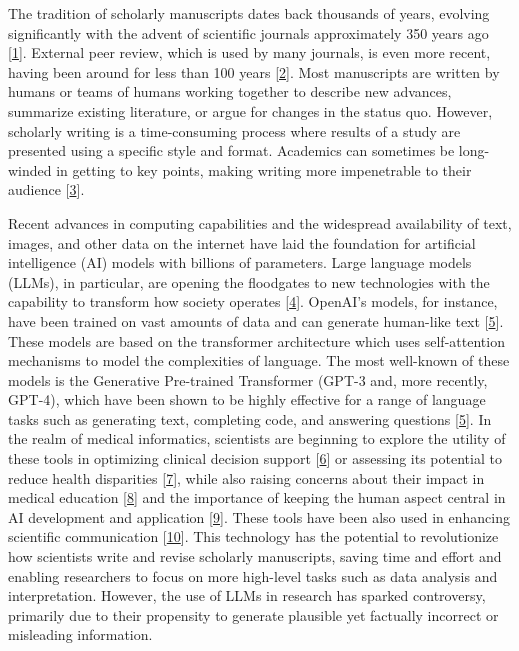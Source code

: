 \documentclass[
]{article}
\begin{document}
The tradition of scholarly manuscripts dates back thousands of years, evolving significantly with the advent of scientific journals approximately 350 years ago {[}\protect\hyperlink{ref-F3iZfGUC}{1}{]}.
External peer review, which is used by many journals, is even more recent, having been around for less than 100 years {[}\protect\hyperlink{ref-1HMhNrQq1}{2}{]}.
Most manuscripts are written by humans or teams of humans working together to describe new advances, summarize existing literature, or argue for changes in the status quo.
However, scholarly writing is a time-consuming process where results of a study are presented using a specific style and format.
Academics can sometimes be long-winded in getting to key points, making writing more impenetrable to their audience {[}\protect\hyperlink{ref-19YWsShi0}{3}{]}.

Recent advances in computing capabilities and the widespread availability of text, images, and other data on the internet have laid the foundation for artificial intelligence (AI) models with billions of parameters.
Large language models (LLMs), in particular, are opening the floodgates to new technologies with the capability to transform how society operates {[}\protect\hyperlink{ref-xq1uEbPa}{4}{]}.
OpenAI's models, for instance, have been trained on vast amounts of data and can generate human-like text {[}\protect\hyperlink{ref-bYOaJHMe}{5}{]}.
These models are based on the transformer architecture which uses self-attention mechanisms to model the complexities of language.
The most well-known of these models is the Generative Pre-trained Transformer (GPT-3 and, more recently, GPT-4), which have been shown to be highly effective for a range of language tasks such as generating text, completing code, and answering questions {[}\protect\hyperlink{ref-bYOaJHMe}{5}{]}.
In the realm of medical informatics, scientists are beginning to explore the utility of these tools in optimizing clinical decision support {[}\protect\hyperlink{ref-gRhoGuC4}{6}{]} or assessing its potential to reduce health disparities {[}\protect\hyperlink{ref-CYB5vhZp}{7}{]}, while also raising concerns about their impact in medical education {[}\protect\hyperlink{ref-h8wInPLE}{8}{]} and the importance of keeping the human aspect central in AI development and application {[}\protect\hyperlink{ref-Z2ek25Ak}{9}{]}.
These tools have been also used in enhancing scientific communication {[}\protect\hyperlink{ref-Svww2RUh}{10}{]}.
This technology has the potential to revolutionize how scientists write and revise scholarly manuscripts, saving time and effort and enabling researchers to focus on more high-level tasks such as data analysis and interpretation.
However, the use of LLMs in research has sparked controversy, primarily due to their propensity to generate plausible yet factually incorrect or misleading information.
\end{document}

